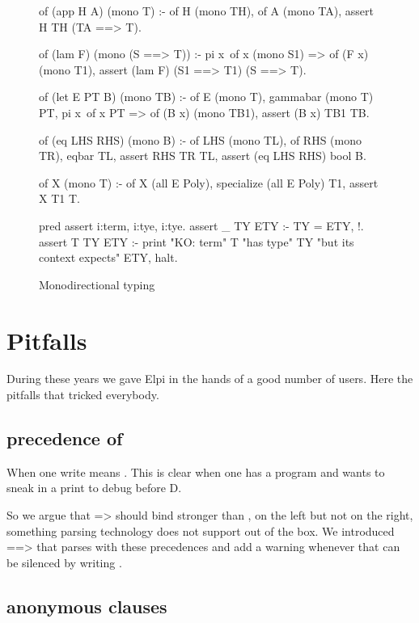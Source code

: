 \documentclass[a4paper, 11pt]{book}
\begin{document}
\begin{figure}
\begin{elpicode}
of (app H A) (mono T) :-
  of H (mono TH),
  of A (mono TA),
  assert H TH (TA ==> T).

of (lam F) (mono (S ==> T)) :-
  pi x\ of x (mono S1) => of (F x) (mono T1),
  assert (lam F) (S1 ==> T1) (S ==> T).

of (let E PT B) (mono TB) :-
  of E (mono T),
  gammabar (mono T) PT,
  pi x\ of x PT => of (B x) (mono TB1),
  assert (B x) TB1 TB.

of (eq LHS RHS) (mono B) :-
  of LHS (mono TL),
  of RHS (mono TR),
  eqbar TL,
  assert RHS TR TL,
  assert (eq LHS RHS) bool B.

of X (mono T) :- of X (all E Poly), specialize (all E Poly) T1, assert X T1 T.

pred assert i:term, i:tye, i:tye.
assert _ TY ETY :- TY = ETY, !.
assert T TY ETY :-
  print "KO: term" T "has type" TY "but its context expects" ETY, halt.
\end{elpicode}
\caption[monodirectional]{Monodirectional typing\label{hm:mono}}
\end{figure}


\section{Pitfalls}

During these years we gave Elpi in the hands of a
good number of users. Here the pitfalls that tricked everybody.

\subsection{precedence of \elpiinline{=>}}

When one write  means
. This is clear when
one has a program  and wants
to sneak in a print to debug before D.

So we argue that => should bind stronger than ,
on the left but not on the right, something parsing
technology does not support out of the box. We introduced
==> that parses with these precedences and add a warning
whenever  that can be silenced
by writing .

\subsection{anonymous clauses}
\end{document}
